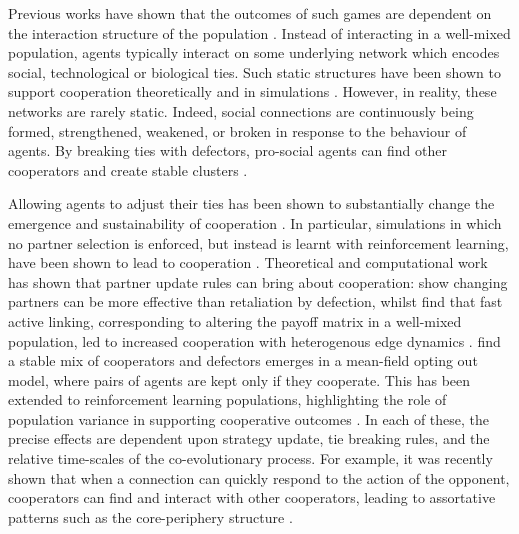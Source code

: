 \documentclass[10pt]{article}
\begin{document}
Previous works have shown that the outcomes of such games are dependent on the interaction structure of the population \cite{nowak_five_2006, rand_dynamic_2011, santos_cooperation_2006, bara_enabling_2022}. Instead of interacting in a well-mixed population, agents typically interact on some underlying network which encodes social, technological or biological ties. Such static structures have been shown to support cooperation theoretically \cite{fotouhi_evolution_2019, ohtsuki_simple_2006} and in simulations \cite{santos_scale-free_2005}. However, in reality, these networks are rarely static. Indeed, social connections are continuously being formed, strengthened, weakened, or broken in response to the behaviour of agents. By breaking ties with defectors, pro-social agents can find other cooperators \cite{melamed_prosocial_2017} and create stable clusters \cite{fehl_co-evolution_2011}. 

Allowing agents to adjust their ties has been shown to substantially change the emergence and sustainability of cooperation \cite{zhang_opting_2016, anastassacos_partner_2020, izquierdo_successful_2026}. In particular, simulations in which no partner selection is enforced, but instead is learnt with reinforcement learning, have been shown to lead to cooperation \cite{leung_learning_2024, fan_colearning_2025, defection_russell2026}. Theoretical and computational work has shown that partner update rules can bring about cooperation: \cite{graser_repeated_2025} show changing partners can be more effective than retaliation by defection, whilst \cite{pacheco_active_2006} find that fast active linking, corresponding to altering the payoff matrix in a well-mixed population, led to increased cooperation with heterogenous edge dynamics \cite{segbroeck_coevolution_2010}. \cite{zheng_simple_2017} find a stable mix of cooperators and defectors emerges in a mean-field opting out model, where pairs of agents are kept only if they cooperate. This has been extended to reinforcement learning populations, highlighting the role of population variance in supporting cooperative outcomes \cite{russell2026dynamicspolicygradient}. In each of these, the precise effects are dependent upon strategy update, tie breaking rules, and the relative time-scales of the co-evolutionary process. For example, it was recently shown that when a connection can quickly respond to the action of the opponent, cooperators can find and interact with other cooperators, leading to assortative patterns such as the core-periphery structure \cite{bara_enabling_2022}.
\end{document}

